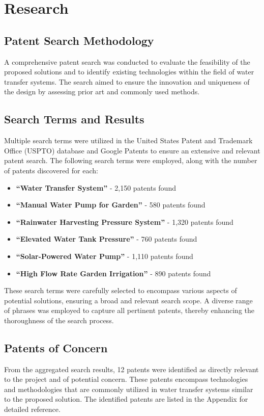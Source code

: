 \documentclass[12pt]{report}
\begin{document}
\section{Research}

\subsection{Patent Search Methodology}
A comprehensive patent search was conducted to evaluate the feasibility of the proposed solutions and to identify existing technologies within the field of water transfer systems. The search aimed to ensure the innovation and uniqueness of the design by assessing prior art and commonly used methods.

\subsection{Search Terms and Results}
Multiple search terms were utilized in the United States Patent and Trademark Office (USPTO) database and Google Patents to ensure an extensive and relevant patent search. The following search terms were employed, along with the number of patents discovered for each:

\begin{itemize}
    \item \textbf{``Water Transfer System''} - 2,150 patents found
    \item \textbf{``Manual Water Pump for Garden''} - 580 patents found
    \item \textbf{``Rainwater Harvesting Pressure System''} - 1,320 patents found
    \item \textbf{``Elevated Water Tank Pressure''} - 760 patents found
    \item \textbf{``Solar-Powered Water Pump''} - 1,110 patents found
    \item \textbf{``High Flow Rate Garden Irrigation''} - 890 patents found
\end{itemize}

These search terms were carefully selected to encompass various aspects of potential solutions, ensuring a broad and relevant search scope. A diverse range of phrases was employed to capture all pertinent patents, thereby enhancing the thoroughness of the search process.

\subsection{Patents of Concern}
From the aggregated search results, 12 patents were identified as directly relevant to the project and of potential concern. These patents encompass technologies and methodologies that are commonly utilized in water transfer systems similar to the proposed solution. The identified patents are listed in the Appendix for detailed reference.
\end{document}
